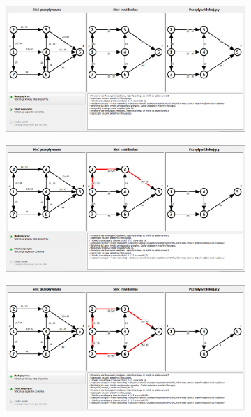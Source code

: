 \begin{appendices}
\begin{figure}
\begin{subfigure}{\textwidth}
 		\end{subfigure}\par\bigskip
 		\begin{subfigure}{\textwidth}
 			\includegraphics[width=0.9\linewidth]{./img/dinic05.jpg}
 		\end{subfigure}\par\bigskip
 		\begin{subfigure}{\textwidth}
 			\includegraphics[width=0.9\linewidth]{./img/dinic06.jpg}
 		\end{subfigure}
 	\end{figure}
 	\begin{figure}
 		\ContinuedFloat
 		\begin{subfigure}{\textwidth}
 			\includegraphics[width=0.9\linewidth]{./img/dinic07.jpg}

\end{subfigure}
\end{figure}
\end{appendices}
